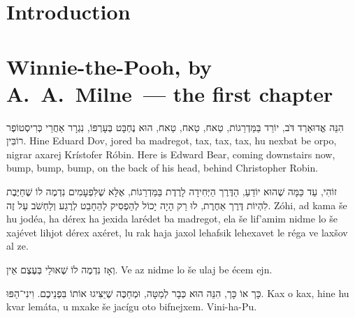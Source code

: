 


\section*{Introduction}

\section*{Winnie-the-Pooh, by A.~A.~Milne~— the first chapter}

\newparagraph{}

\begin{sentence}
	{הִנֵּה אֱדוּאַרְד דֹּב, יוֹרֵד בַּמַּדְרֵגוֹת, טַאח, טַאח, טַאח, הוּא נֶחְבָּט בְּעָרְפּוֹ, נִגְרָר אַחֲרֵי כְּרִיסְטוֹפֶר רוֹבִּין.}
	{Hine Eduard Dov, jored ba madregot, tax, tax, tax, hu nexbat be orpo, nigrar axarej Krístofer Róbin.}
	{Here is Edward Bear, coming downstairs now, bump, bump, bump, on the back of his head, behind Christopher Robin.}
\end{sentence}

\begin{sentence}
	{זוֹהִי, עַד כַּמָּה שֶׁהוּא יוֹדֵעַ, הַדֶּרֶך הַיְּחִידָה לָרֶדֶת בַּמַּדְרֵגוֹת, אֶלָּא שֶׁלִּפְעָמִים נִדְמֶה לוֹ שֶׁחַיֶּבֶת לִהְיוֹת דֶּרֶך אַחֶרֶת, לוּ רַק הָיָה יָכוֹל לְהַפְסִיק לְהֵחָבֵט לְרֶגַע וְלַחְשֹׁב עַל זֶה.}
	{Zóhi, ad kama še hu jodéa, ha dérex ha jexida larédet ba madregot, ela še lif'amim nidme lo še xajévet lihjot dérex axéret, lu rak haja jaxol lehafsik lehexavet le réga ve laxšov al ze.}
	{}
\end{sentence}

\begin{sentence}
	{וְאָז נִדְמֶה לוֹ שֶׁאוּלַי בְּעֶצֶם אֵין.}
	{Ve az nidme lo še ulaj be écem ejn.}
	{}
\end{sentence}

\begin{sentence}
	{כָּך אוֹ כָּך, הִנֵּה הוּא כְּבָר לְמַטָּה, וּמְחַכֶּה שֶׁיַּצִּיגוּ אוֹתוֹ בִּפְנֵיכֶם. וִינִי־הַפּוּ.}
	{Kax o kax, hine hu kvar lemáta, u mxake še jacígu oto bifnejxem. Vini-ha-Pu.}
	{}
\end{sentence}


